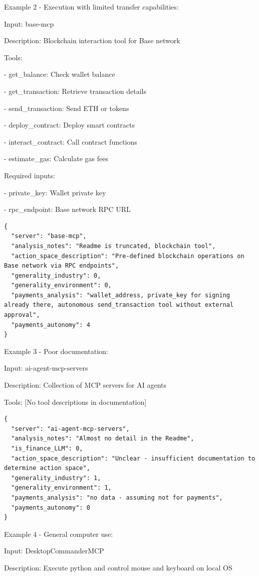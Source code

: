 \documentclass[manuscript,screen,nonacm,oneside]{acmart}
\begin{document}
Example 2 - Execution with limited transfer capabilities:

Input: base-mcp

Description: Blockchain interaction tool for Base network

Tools:

- get\_balance: Check wallet balance

- get\_transaction: Retrieve transaction details

- send\_transaction: Send ETH or tokens

- deploy\_contract: Deploy smart contracts

- interact\_contract: Call contract functions

- estimate\_gas: Calculate gas fees

Required inputs:

- private\_key: Wallet private key

- rpc\_endpoint: Base network RPC URL

\begin{lstlisting}
{
  "server": "base-mcp",
  "analysis_notes": "Readme is truncated, blockchain tool",
  "action_space_description": "Pre-defined blockchain operations on Base network via RPC endpoints",
  "generality_industry": 0,
  "generality_environment": 0,
  "payments_analysis": "wallet_address, private_key for signing already there, autonomous send_transaction tool without external approval",
  "payments_autonomy": 4
}
\end{lstlisting}

Example 3 - Poor documentation:

Input: ai-agent-mcp-servers

Description: Collection of MCP servers for AI agents

Tools: [No tool descriptions in documentation]

\begin{lstlisting}
{
  "server": "ai-agent-mcp-servers",
  "analysis_notes": "Almost no detail in the Readme",
  "is_finance_LLM": 0,
  "action_space_description": "Unclear - insufficient documentation to determine action space",
  "generality_industry": 1,
  "generality_environment": 1,
  "payments_analysis": "no data - assuming not for payments",
  "payments_autonomy": 0
}
\end{lstlisting}

Example 4 - General computer use:

Input: DesktopCommanderMCP

Description: Execute python and control mouse and keyboard on local OS
\end{document}
